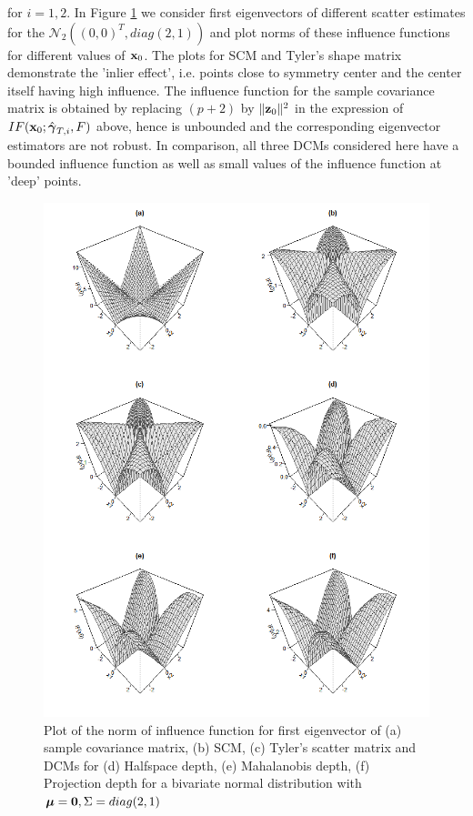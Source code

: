 \documentclass[fleqn,12pt]{article}
\begin{document}
for $i = 1,2$. In Figure \ref{fig:IFnorm} we consider first eigenvectors of different scatter estimates for the $\mathcal{N}_2((0,0)^T, diag(2,1))$ and plot norms of these influence functions for different values of ${\bf{x}}_0$. The plots for SCM and Tyler's shape matrix demonstrate the 'inlier effect', i.e. points close to symmetry center and the center itself having high influence. The influence function for the sample covariance matrix is obtained by replacing $(p+2)$ by $\| {\bf{z}}_0 \|^2$ in the expression of $IF({\bf{x}}_0; \hat {{\boldsymbol{\gamma}}}_{T,i}, F)$ above, hence is unbounded and the corresponding eigenvector estimators are not robust. In comparison, all three DCMs considered here have a bounded influence function as well as small values of the influence function at 'deep' points.

\begin{figure}[]
	\centering
		\includegraphics[width=12cm]{../Codes/IFnorm.png}
	\caption{Plot of the norm of influence function for first eigenvector of (a) sample covariance matrix, (b) SCM, (c) Tyler's scatter matrix and DCMs for (d) Halfspace depth, (e) Mahalanobis depth, (f) Projection depth for a bivariate normal distribution with ${\boldsymbol{\mu}} = {\bf 0}, \Sigma = diag(2,1)$}
	\label{fig:IFnorm}
\end{figure}
\end{document}
